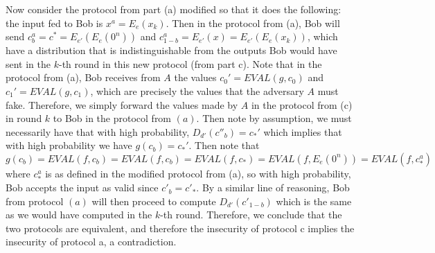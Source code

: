\documentclass{article}
\begin{document}
\begin{enumerate}[noitemsep,topsep=\mdcompacttopsep,label=\alph*.]
\begin{mdbmarginx}{1ex}{0pt}{1ex}{0pt}
Now consider the protocol from part (a) modified so that it does the following: the input
fed to Bob is $x^a = E_e(x_k)$. Then in the protocol from (a), Bob will send $c_b^a = c^* = E_{e'}(E_e(0^n))$
and $c_{1-b}^a = E_{e'}(x) = E_{e'}(E_e(x_k))$, which have a distribution that is indistinguishable
from the outputs Bob would have
sent in the $k$-th round in this new protocol (from part c).\mdbr
{}Note that in the protocol from (a), Bob receives from $A$
the values $c_0' = EVAL(g,c_0)$ and $c_1' = EVAL(g,c_1)$, which are precisely the values that the
adversary $A$ must fake. Therefore, we simply forward the values made by $A$ in the protocol from
(c) in round $k$ to Bob in the protocol from $(a)$. Then note by assumption, we must necessarily have that
with high probability, $D_{d'}(c''_b) = c_*'$ which implies that with high probability we have
$g(c_b) = c_*'$. Then note that $g(c_b)= EVAL(f,c_b) = EVAL(f,c_b) = EVAL(f,c_*) = EVAL(f, E_e(0^n)) = EVAL(f, c_*^a)$ where
$c_*^a$ is as defined in the modified protocol from (a), so with high probability,
Bob accepts the input as valid since $c'_b = c'_*$. By a similar line of reasoning, Bob from protocol 
$(a)$ will then proceed to compute $D_{d'}(c'_{1-b})$ which is the same as we would have computed 
in the $k$-th round. Therefore, we conclude that the two protocols are equivalent, and therefore
the insecurity of protocol c implies the insecurity of protocol a, a contradiction.%
\end{mdbmarginx}%
\end{enumerate}%
\end{document}
